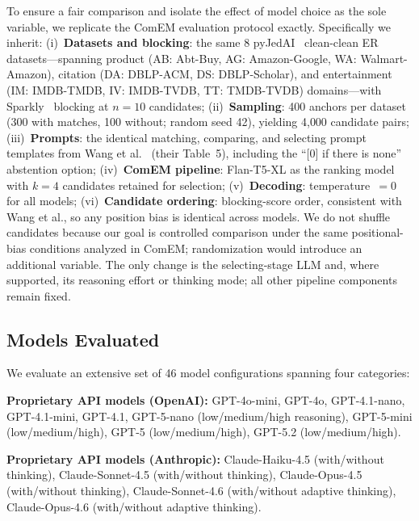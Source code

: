 \documentclass[runningheads]{llncs}
\begin{document}
To ensure a fair comparison and isolate the effect of model choice as the sole variable, we replicate the ComEM evaluation protocol exactly. Specifically we inherit: (i)~\textbf{Datasets and blocking}: the same 8 pyJedAI~\cite{nikoletos2022jedai} clean-clean ER datasets---spanning product (AB: Abt-Buy, AG: Amazon-Google, WA: Walmart-Amazon), citation (DA: DBLP-ACM, DS: DBLP-Scholar), and entertainment (IM: IMDB-TMDB, IV: IMDB-TVDB, TT: TMDB-TVDB) domains---with Sparkly~\cite{paulsen2023sparkly} blocking at $n{=}10$ candidates; (ii)~\textbf{Sampling}: 400 anchors per dataset (300 with matches, 100 without; random seed 42), yielding 4{,}000 candidate pairs; (iii)~\textbf{Prompts}: the identical matching, comparing, and selecting prompt templates from Wang et al.~\cite{wang2025match} (their Table~5), including the ``[0] if there is none'' abstention option; (iv)~\textbf{ComEM pipeline}: Flan-T5-XL as the ranking model with $k{=}4$ candidates retained for selection; (v)~\textbf{Decoding}: temperature~$=0$ for all models; (vi)~\textbf{Candidate ordering}: blocking-score order, consistent with Wang et al., so any position bias is identical across models.
We do not shuffle candidates because our goal is controlled comparison under the same positional-bias conditions analyzed in ComEM; randomization would introduce an additional variable. The only change is the selecting-stage LLM and, where supported, its reasoning effort or thinking mode; all other pipeline components remain fixed.


\subsection{Models Evaluated}

We evaluate an extensive set of 46 model configurations spanning four categories:

\textbf{Proprietary API models (OpenAI):} GPT-4o-mini, GPT-4o, GPT-4.1-nano, GPT-4.1-mini, GPT-4.1, GPT-5-nano (low/medium/high reasoning), GPT-5-mini (low/medium/high), GPT-5 (low/medium/high), GPT-5.2 (low/medium/high).

\textbf{Proprietary API models (Anthropic):} Claude-Haiku-4.5 (with/without thinking), Claude-Sonnet-4.5 (with/without thinking), Claude-Opus-4.5 (with/without thinking), Claude-Sonnet-4.6 (with/without adaptive thinking), Claude-Opus-4.6 (with/without adaptive thinking).
\end{document}
